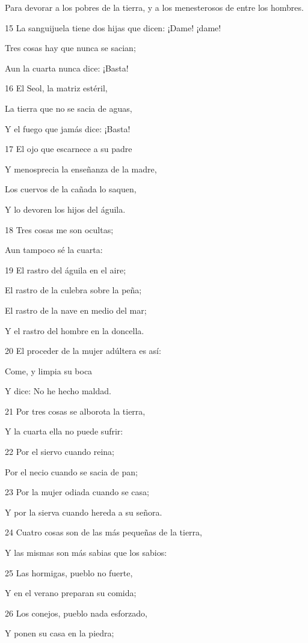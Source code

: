 \par Para devorar a los pobres de la tierra, y a los menesterosos de entre los hombres.
\par 15 La sanguijuela tiene dos hijas que dicen: ¡Dame! ¡dame!
\par Tres cosas hay que nunca se sacian;
\par Aun la cuarta nunca dice: ¡Basta!
\par 16 El Seol, la matriz estéril,
\par La tierra que no se sacia de aguas,
\par Y el fuego que jamás dice: ¡Basta!
\par 17 El ojo que escarnece a su padre
\par Y menosprecia la enseñanza de la madre,
\par Los cuervos de la cañada lo saquen,
\par Y lo devoren los hijos del águila.
\par 18 Tres cosas me son ocultas;
\par Aun tampoco sé la cuarta:
\par 19 El rastro del águila en el aire;
\par El rastro de la culebra sobre la peña;
\par El rastro de la nave en medio del mar;
\par Y el rastro del hombre en la doncella.
\par 20 El proceder de la mujer adúltera es así:
\par Come, y limpia su boca
\par Y dice: No he hecho maldad.
\par 21 Por tres cosas se alborota la tierra,
\par Y la cuarta ella no puede sufrir:
\par 22 Por el siervo cuando reina;
\par Por el necio cuando se sacia de pan;
\par 23 Por la mujer odiada cuando se casa;
\par Y por la sierva cuando hereda a su señora.
\par 24 Cuatro cosas son de las más pequeñas de la tierra,
\par Y las mismas son más sabias que los sabios:
\par 25 Las hormigas, pueblo no fuerte,
\par Y en el verano preparan su comida;
\par 26 Los conejos, pueblo nada esforzado,
\par Y ponen su casa en la piedra;
